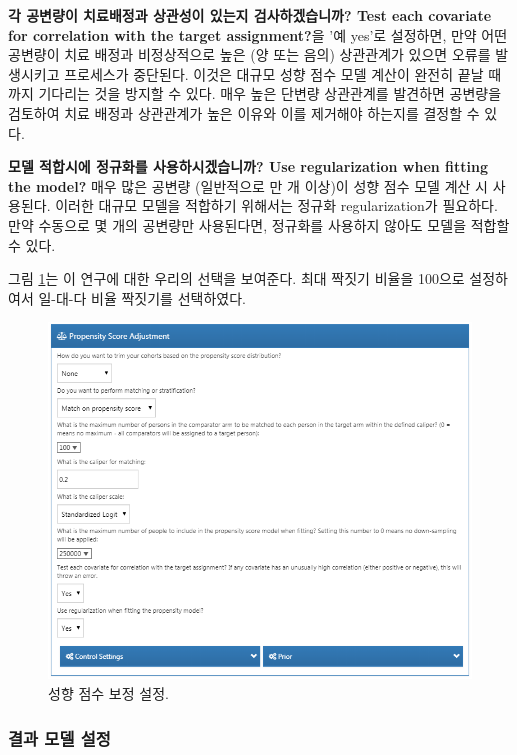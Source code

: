 \documentclass[10.5pt]{book}
\theoremstyle{definition}
\theoremstyle{definition}
\theoremstyle{definition}
\theoremstyle{remark}
\begin{document}
\textbf{각 공변량이 치료배정과 상관성이 있는지 검사하겠습니까? Test each
covariate for correlation with the target assignment?}을 '예 yes'로
설정하면, 만약 어떤 공변량이 치료 배정과 비정상적으로 높은 (양 또는
음의) 상관관계가 있으면 오류를 발생시키고 프로세스가 중단된다. 이것은
대규모 성향 점수 모델 계산이 완전히 끝날 때까지 기다리는 것을 방지할 수
있다. 매우 높은 단변량 상관관계를 발견하면 공변량을 검토하여 치료 배정과
상관관계가 높은 이유와 이를 제거해야 하는지를 결정할 수 있다.

\textbf{모델 적합시에 정규화를 사용하시겠습니까? Use regularization when
fitting the model?} 매우 많은 공변량 (일반적으로 만 개 이상)이 성향 점수
모델 계산 시 사용된다. 이러한 대규모 모델을 적합하기 위해서는 정규화
regularization가 필요하다. 만약 수동으로 몇 개의 공변량만 사용된다면,
정규화를 사용하지 않아도 모델을 적합할 수 있다.

그림 \ref{fig:psSettings}는 이 연구에 대한 우리의 선택을 보여준다. 최대
짝짓기 비율을 100으로 설정하여서 일-대-다 비율 짝짓기를 선택하였다.

\begin{figure}

{\centering \includegraphics[width=1\linewidth]{images/PopulationLevelEstimation/psSettings} 

}

\caption{성향 점수 보정 설정.}\label{fig:psSettings}
\end{figure}

\subsubsection*{결과 모델 설정}\label{--}
\end{document}
